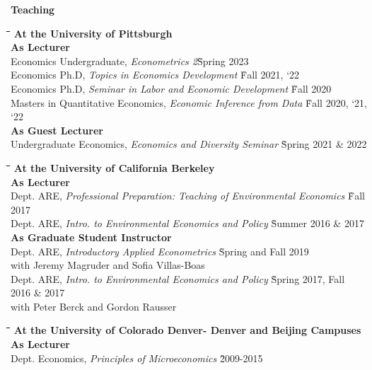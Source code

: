 \documentclass[10pt, oneside]{article}
\newcommand\mytabs{\hspace*{1cm}\=\hspace{1cm}\=\hspace{1cm}\=\hspace{1cm}\=\hspace{1cm}\=\hspace{1cm}\=\hspace{1cm}\=\hspace{1cm}\=\hspace{1cm}\=\hspace{1cm}}
\newenvironment{mysec}[1][\mytabs]
  {\begin{tabbing}#1\kill\ignorespaces}
  {\end{tabbing}}
\begin{document}
\begin{minipage}[t]{0.1\linewidth}
\textbf{Teaching}
\end{minipage}\hspace{0.05\linewidth}
\begin{minipage}[t]{0.8\linewidth}
\begin{mysec} 
\textbf{At the University of Pittsburgh} \\
\>\textbf{As Lecturer} \\
\>\>Economics Undergraduate,  \emph{Econometrics 2}\`Spring 2023\\
\>\>Economics Ph.D, \emph{Topics  in Economics Development}  \`Fall 2021, `22\\
\>\>Economics Ph.D, \emph{Seminar in Labor and Economic Development}  \`Fall 2020\\
\>\>Masters in Quantitative Economics, \emph{Economic Inference from Data}  \`Fall 2020, `21, `22\\
\>\textbf{As Guest Lecturer} \\
\>\>Undergraduate Economics, \emph{Economics and Diversity Seminar}  \`Spring 2021 \& 2022\\
\end{mysec}
\begin{mysec} 
\textbf{At the University of California Berkeley} \\
\>\textbf{As Lecturer} \\
\>\>Dept. ARE, \emph{Professional Preparation: Teaching of Environmental Economics}  \`Fall 2017 \\
\>\>Dept. ARE, \emph{Intro. to Environmental Economics and Policy}  \` Summer 2016 \& 2017 \\
\>\textbf{As Graduate Student Instructor} \\
\>\>Dept. ARE, \emph{Introductory Applied Econometrics}  \` Spring and Fall 2019 \\
\>\>\> with Jeremy Magruder and Sofia Villas-Boas\\
\>\>Dept. ARE, \emph{Intro. to Environmental Economics and Policy}  \` Spring 2017, Fall 2016 \& 2017 \\
\>\>\> with Peter Berck and Gordon Rausser
\end{mysec}
\begin{mysec} 
\textbf{At the University of Colorado Denver- Denver and Beijing Campuses} \\
\>\textbf{As Lecturer} \\
\>\>Dept. Economics, \emph{Principles of Microeconomics}  \`2009-2015 \\

\end{mysec}
\end{minipage}
\end{document}
